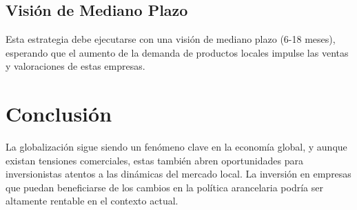 \documentclass[a4paper,12pt]{article}
\begin{document}
\subsection{Visión de Mediano Plazo}
Esta estrategia debe ejecutarse con una visión de mediano plazo (6-18 meses), esperando que el aumento de la demanda de productos locales impulse las ventas y valoraciones de estas empresas.

\section{Conclusión}
La globalización sigue siendo un fenómeno clave en la economía global, y aunque existan tensiones comerciales, estas también abren oportunidades para inversionistas atentos a las dinámicas del mercado local. La inversión en empresas que puedan beneficiarse de los cambios en la política arancelaria podría ser altamente rentable en el contexto actual.
\end{document}
